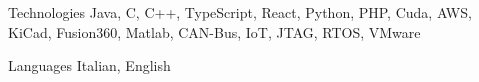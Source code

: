 

\begin{cvskills}

  \cvskill
    {Technologies} %
    {Java, C, C++, TypeScript, React, Python, PHP, Cuda, AWS, KiCad, Fusion360, Matlab, CAN-Bus, IoT, JTAG, RTOS, VMware} %

  \cvskill
    {Languages} %
    {Italian, English} %

\end{cvskills}
